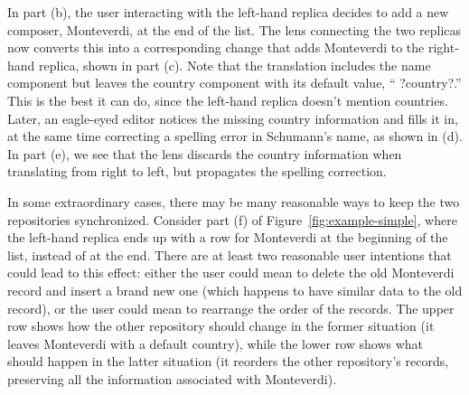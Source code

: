In part (b), the user interacting with the
left-hand replica decides to add a new composer, {\sf Monteverdi}, at the
end of the list. The lens connecting the two replicas now converts this into
a corresponding change that adds {\sf Monteverdi} to the right-hand replica,
shown in part (c).
%
Note that the translation includes the name component but
leaves the country component with its default value, ``{\sf
  ?country?}.''  This is the best it can do, since the
left-hand replica doesn't mention countries.
%
Later, an eagle-eyed editor notices the missing country information and
fills it in, at the same time correcting a spelling error in {\sf
  Schumann}'s name, as shown in (d). In part (e), we see that the lens
discards the country information when
translating from right to left, but propagates the spelling
correction.

In some extraordinary cases, there may be many reasonable ways to keep the
two repositories synchronized.
Consider part (f) of Figure~\ref{fig:example-simple}, where the left-hand
replica ends up with a row for {\sf Monteverdi} at the beginning of the
list, instead of at the end.
%
There are at least two reasonable user intentions that could lead to this
effect: either the user could mean to delete the old {\sf Monteverdi} record
and insert a brand new one (which happens to have similar data to the old
record), or the user could mean to rearrange the order of the records. The
upper row shows how the other repository should change in the former
situation (it leaves {\sf Monteverdi} with a default country), while the
lower row shows what should happen in the latter situation (it reorders the
other repository's records, preserving all the information associated with
{\sf Monteverdi}).


